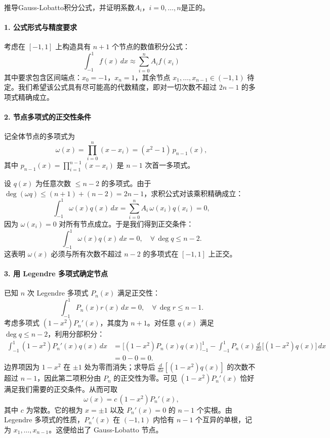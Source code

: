 \documentclass{article}
\begin{document}
推导Gauss-Lobatto积分公式，并证明系数\(A_i\)，\(i=0,\dots,n\)是正的。

\paragraph{1. 公式形式与精度要求}

考虑在 \([-1,1]\) 上构造具有 \(n+1\) 个节点的数值积分公式：
\[
\int_{-1}^{1} f(x) \,dx \approx \sum_{i=0}^{n} A_i f(x_i)
\]
其中要求包含区间端点：\(x_0 = -1\)，\(x_n = 1\)，其余节点 \(x_1,\dots,x_{n-1} \in (-1,1)\) 待定。我们希望该公式具有尽可能高的代数精度，即对一切次数不超过 \(2n-1\) 的多项式精确成立。

\paragraph{2. 节点多项式的正交性条件}

记全体节点的多项式为
\[
\omega(x) = \prod_{i=0}^{n} (x-x_i) = (x^2-1)\,p_{n-1}(x),
\]
其中 \(p_{n-1}(x) = \prod_{i=1}^{n-1} (x-x_i)\) 是 \(n-1\) 次首一多项式。

设 \(q(x)\) 为任意次数 \(\le n-2\) 的多项式。由于 \(\deg(\omega q) \le (n+1)+(n-2) = 2n-1\)，求积公式对该乘积精确成立：
\[
\int_{-1}^{1} \omega(x) q(x) \,dx = \sum_{i=0}^{n} A_i \,\omega(x_i) q(x_i) = 0,
\]
因为 \(\omega(x_i)=0\) 对所有节点成立。于是我们得到正交条件：
\[
\int_{-1}^{1} \omega(x) q(x) \,dx = 0, \quad \forall\, \deg q \le n-2.
\]
这表明 \(\omega(x)\) 必须与所有次数不超过 \(n-2\) 的多项式在 \([-1,1]\) 上正交。

\paragraph{3. 用 Legendre 多项式确定节点}

已知 \(n\) 次 Legendre 多项式 \(P_n(x)\) 满足正交性：
\[
\int_{-1}^{1} P_n(x) r(x) \,dx = 0, \quad \forall\, \deg r \le n-1.
\]
考虑多项式 \((1-x^2)P_n'(x)\)，其度为 \(n+1\)。对任意 \(q(x)\) 满足 \(\deg q \le n-2\)，利用分部积分：
\[
\begin{aligned}
\int_{-1}^{1} (1-x^2)P_n'(x) q(x) \,dx 
&= \Big[ (1-x^2)P_n(x)q(x) \Big]_{-1}^{1} - \int_{-1}^{1} P_n(x) \frac{d}{dx}\big[(1-x^2)q(x)\big] \,dx \\
&= 0 - 0 = 0.
\end{aligned}
\]
边界项因为 \(1-x^2\) 在 \(\pm1\) 处为零而消失；求导后 \(\frac{d}{dx}[(1-x^2)q(x)]\) 的次数不超过 \(n-1\)，因此第二项积分由 \(P_n\) 的正交性为零。可见 \((1-x^2)P_n'(x)\) 恰好满足我们需要的正交条件。从而可取
\[
\omega(x) = c\,(1-x^2)P_n'(x),
\]
其中 \(c\) 为常数。它的根为 \(x=\pm1\) 以及 \(P_n'(x)=0\) 的 \(n-1\) 个实根。由 Legendre 多项式的性质，\(P_n'(x)\) 在 \((-1,1)\) 内恰有 \(n-1\) 个互异的单根，记为 \(x_1,\dots,x_{n-1}\)。这便给出了 Gauss-Lobatto 节点。
\end{document}
